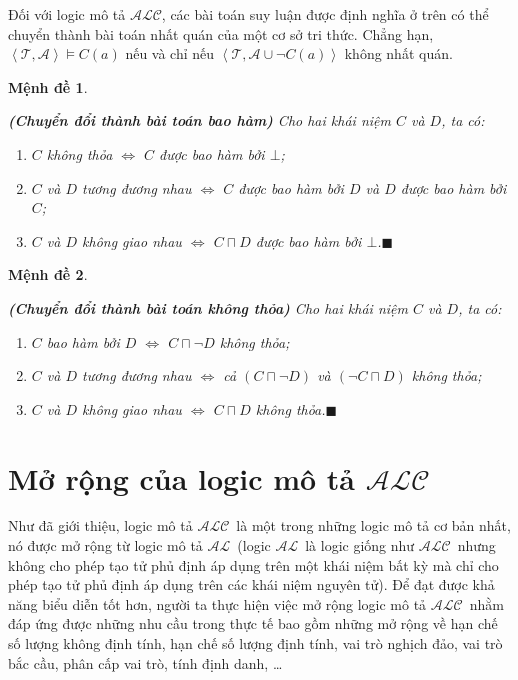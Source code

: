 \documentclass[12pt,a4paper]{report}
\newtheorem{Proposition}{Mệnh đề}[chapter]
\newenvironment{proposition}
{
  \smallskip
  \begin{Proposition}
    \begin{em}}
    {\end{em}
  \end{Proposition}
  \smallskip
}
\newcommand{\myend}{\mbox{}\hfill\mbox{{\scriptsize$\!\blacksquare$}}}
\newcommand{\mand}{\sqcap}
\newcommand{\AL}{$\mathcal{AL}$}
\newcommand{\ALC}{$\mathcal{ALC}$}
\newcommand{\mT}{\mathcal{T}}
\newcommand{\mA}{\mathcal{A}}
\def\tuple#1{\left\langle#1\right\rangle}
\begin{document}
Đối với logic mô tả \ALC, các bài toán suy luận được định nghĩa ở trên có thể chuyển thành bài toán nhất quán của một cơ sở tri thức. Chẳng hạn, $\mathcal{\tuple{T, A}} \models C(a)$ nếu và chỉ nếu $\tuple{\mT, \mA \cup \neg C(a)}$ không nhất quán.

\begin{proposition}\label{pro:ReduceSubsumption}
\textbf{(Chuyển đổi thành bài toán bao hàm)} Cho hai khái niệm $C$ và $D$, ta có:
\begin{enumerate}
  \item $C$ không thỏa $\Leftrightarrow$ $C$ được bao hàm bởi $\bot$;
  \item $C$ và $D$ tương đương nhau $\Leftrightarrow$ $C$ được bao hàm bởi $D$ và $D$ được bao hàm bởi $C$;
  \item $C$ và $D$ không giao nhau $\Leftrightarrow$ $C \mand D$ được bao hàm bởi $\bot$.\myend
\end{enumerate}
\end{proposition}

\begin{proposition}\label{pro:ReduceUnSat}
\textbf{(Chuyển đổi thành bài toán không thỏa)} Cho hai khái niệm $C$ và $D$, ta có:
\begin{enumerate}
  \item $C$ bao hàm bởi $D$ $\Leftrightarrow$ $C \mand \neg D$ không thỏa;
  \item $C$ và $D$ tương đương nhau $\Leftrightarrow$ cả $(C \mand \neg D)$ và $(\neg C \mand D)$ không thỏa;
  \item $C$ và $D$ không giao nhau $\Leftrightarrow$ $C \mand D$ không thỏa.\myend
\end{enumerate}
\end{proposition}

\section{Mở rộng của logic mô tả \ALC}
Như đã giới thiệu, logic mô tả \ALC\ là một trong những logic mô tả cơ bản nhất, nó được mở rộng từ logic mô tả \AL\ (logic \AL\ là logic giống như \ALC\ nhưng không cho phép tạo tử phủ định áp dụng trên một khái niệm bất kỳ mà chỉ cho phép tạo tử phủ định áp dụng trên các khái niệm nguyên tử). Để đạt được khả năng biểu diễn tốt hơn, người ta thực hiện việc mở rộng logic mô tả \ALC\ nhằm đáp ứng được những nhu cầu trong thực tế bao gồm những mở rộng về hạn chế số lượng không định tính, hạn chế số lượng định tính, vai trò nghịch đảo, vai trò bắc cầu, phân cấp vai trò, tính định danh, \ldots
\end{document}
